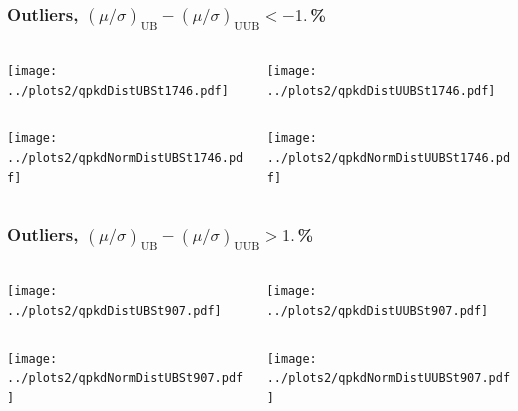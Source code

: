 \documentclass[aspectratio=169]{beamer}
\begin{document}
\begin{frame}
  \frametitle{Outliers, $\left(\mu/\sigma\right)_{\mathrm{UB}} 
  - \left(\mu/\sigma\right)_{\mathrm{UUB}} < -1.$\,\%}
  \vspace{0.2cm}
  \begin{columns}
    \begin{column}{0.5\textwidth}
      \texttt{[image: ../plots2/qpkdDistUBSt1746.pdf]}
    \end{column}
    \begin{column}{0.5\textwidth}
      \texttt{[image: ../plots2/qpkdDistUUBSt1746.pdf]}
    \end{column}
  \end{columns}
  \begin{columns}
    \begin{column}{0.5\textwidth}
      \texttt{[image: ../plots2/qpkdNormDistUBSt1746.pdf]}
    \end{column}
    \begin{column}{0.5\textwidth}
      \texttt{[image: ../plots2/qpkdNormDistUUBSt1746.pdf]}
    \end{column}
  \end{columns}
\end{frame}

\begin{frame}
  \frametitle{Outliers, $\left(\mu/\sigma\right)_{\mathrm{UB}} 
  - \left(\mu/\sigma\right)_{\mathrm{UUB}} > 1.$\,\%}
  \vspace{0.2cm}
  \begin{columns}
    \begin{column}{0.5\textwidth}
      \texttt{[image: ../plots2/qpkdDistUBSt907.pdf]}
    \end{column}
    \begin{column}{0.5\textwidth}
      \texttt{[image: ../plots2/qpkdDistUUBSt907.pdf]}
    \end{column}
  \end{columns}
  \begin{columns}
    \begin{column}{0.5\textwidth}
      \texttt{[image: ../plots2/qpkdNormDistUBSt907.pdf]}
    \end{column}
    \begin{column}{0.5\textwidth}
      \texttt{[image: ../plots2/qpkdNormDistUUBSt907.pdf]}
    \end{column}
  \end{columns}
\end{frame}
\end{document}
